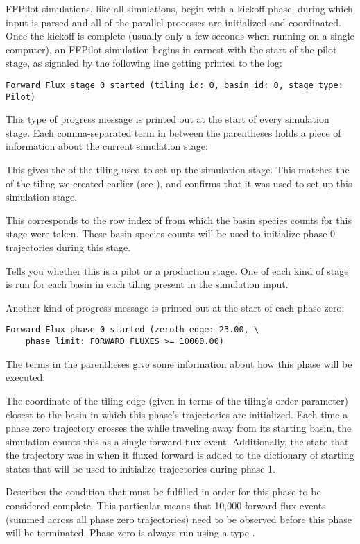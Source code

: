 {FFPilot simulations, like all  simulations, begin with a kickoff phase, during which input is parsed and all of the parallel processes are initialized and coordinated. Once the kickoff is complete (usually only a few seconds when running  on a single computer), an FFPilot simulation begins in earnest with the start of the pilot stage, as signaled by the following line getting printed to the log:
\begin{verbatim}
Forward Flux stage 0 started (tiling_id: 0, basin_id: 0, stage_type: Pilot)
\end{verbatim}
This type of progress message is printed out at the start of every simulation stage. Each comma-separated term in between the parentheses holds a piece of information about the current simulation stage:
\begin{description}[style=nextline]
    \item[\code{tiling_id}] This gives the  of the tiling used to set up the simulation stage. This matches the  of the tiling we created earlier (see ), and confirms that it was used to set up this simulation stage.
    \item[\code{basin_id}] This corresponds to the row index of \code{\tilingbasins} from which the basin species counts for this stage were taken. These basin species counts will be used to initialize phase 0 trajectories during this stage.
    \item[\code{stage_type}] Tells you whether this is a pilot or a production stage. One of each kind of stage is run for each basin in each tiling present in the simulation input.
\end{description}

Another kind of progress message is printed out at the start of each phase zero:
\begin{verbatim}
Forward Flux phase 0 started (zeroth_edge: 23.00, \
    phase_limit: FORWARD_FLUXES >= 10000.00)
\end{verbatim}
The terms in the parentheses give some information about how this phase will be executed:
\begin{description}[style=nextline]
    \item[] The coordinate of the tiling edge (given in terms of the tiling's order parameter) closest to the basin in which this phase's trajectories are initialized. Each time a phase zero trajectory crosses the \code{zeroth_edge} while traveling away from its starting basin, the simulation counts this as a single forward flux event. Additionally, the state that the trajectory was in when it fluxed forward is added to the dictionary of starting states that will be used to initialize trajectories during phase 1.
    \item[\code{phase_limit}] Describes the condition that must be fulfilled in order for this phase to be considered complete. This particular \code{phase_limit} means that 10,000 forward flux events (summed across all phase zero trajectories) need to be observed before this phase will be terminated. Phase zero is always run using a \code{FORWARD_FLUXES} type \code{phase_limit}.
\end{description}

}
